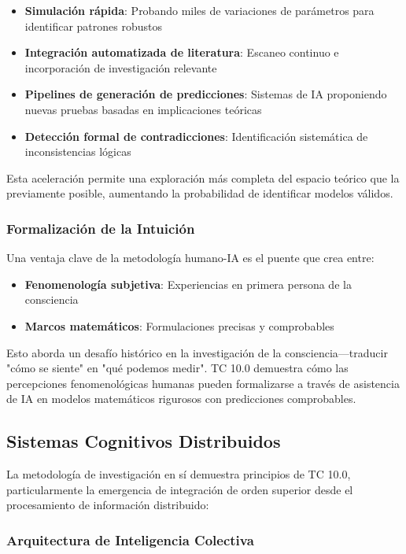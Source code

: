 \documentclass[12pt]{article}
\begin{document}
\begin{itemize}
    \item \textbf{Simulación rápida}: Probando miles de variaciones de parámetros para identificar patrones robustos
    \item \textbf{Integración automatizada de literatura}: Escaneo continuo e incorporación de investigación relevante
    \item \textbf{Pipelines de generación de predicciones}: Sistemas de IA proponiendo nuevas pruebas basadas en implicaciones teóricas
    \item \textbf{Detección formal de contradicciones}: Identificación sistemática de inconsistencias lógicas
\end{itemize}

Esta aceleración permite una exploración más completa del espacio teórico que la previamente posible, aumentando la probabilidad de identificar modelos válidos.

\subsubsection{Formalización de la Intuición}

Una ventaja clave de la metodología humano-IA es el puente que crea entre:

\begin{itemize}
    \item \textbf{Fenomenología subjetiva}: Experiencias en primera persona de la consciencia
    \item \textbf{Marcos matemáticos}: Formulaciones precisas y comprobables
\end{itemize}

Esto aborda un desafío histórico en la investigación de la consciencia—traducir "cómo se siente" en "qué podemos medir". TC 10.0 demuestra cómo las percepciones fenomenológicas humanas pueden formalizarse a través de asistencia de IA en modelos matemáticos rigurosos con predicciones comprobables.

\subsection{Sistemas Cognitivos Distribuidos}

La metodología de investigación en sí demuestra principios de TC 10.0, particularmente la emergencia de integración de orden superior desde el procesamiento de información distribuido:

\subsubsection{Arquitectura de Inteligencia Colectiva}
\end{document}

